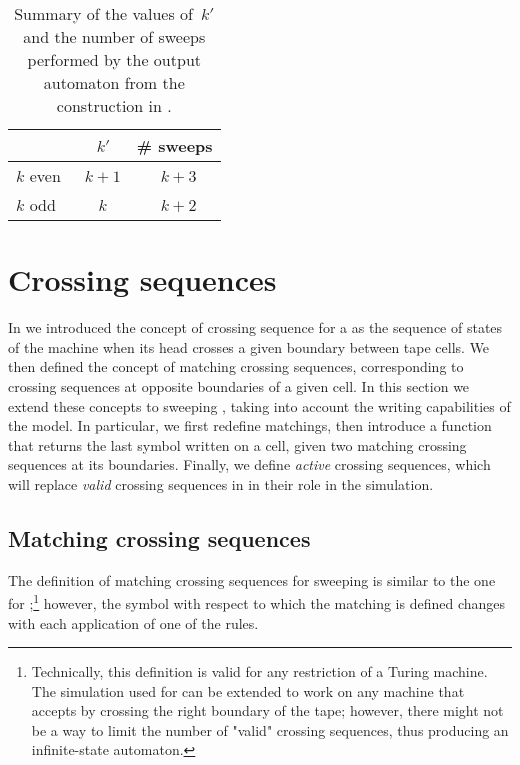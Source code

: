 \begin{table}
	\centering
	\begin{tabular}{lcc}
		\toprule
		~        &~$k'$  & \# sweeps \\
		\midrule
		$k$ even &~$k+1$ &~$k+3$     \\
		$k$ odd  &~$k$   &~$k+2$     \\
		\bottomrule
	\end{tabular}
	\caption[The values of~$k'$ and the number of sweeps performed by a sweeping \kDLA in normal form.]{Summary of the values of~$k'$ and the number of sweeps performed by the output automaton from the construction in .}
	\label{tab:kprimesweep}
\end{table}



\section{Crossing sequences}\label{sec:crossseqswdla}
In  we introduced the concept of crossing sequence for a \TDFA as the sequence of states of the machine when its head crosses a given boundary between tape cells.
We then defined the concept of matching crossing sequences, corresponding to crossing sequences at opposite boundaries of a given cell.
In this section we extend these concepts to sweeping \kDLAs, taking into account the writing capabilities of the model.
In particular, we first redefine matchings, then introduce a function that returns the last symbol written on a cell, given two matching crossing sequences at its boundaries.
Finally, we define \emph{active} crossing sequences, which will replace \emph{valid} crossing sequences in \TDFAs in their role in the simulation.


\subsection{Matching crossing sequences}\label{sub:crossseqswdla-matching}
The definition of matching crossing sequences for sweeping \kDLAs is similar to the one for \TDFAs;\footnote{%
	Technically, this definition is valid for any restriction of a Turing machine. The simulation used for \TDFAs can be extended to work on any machine that accepts by crossing the right boundary of the tape; however, there might not be a way to limit the number of "valid" crossing sequences, thus producing an infinite-state automaton.}
however, the symbol with respect to which the matching is defined changes with each application of one of the rules.

